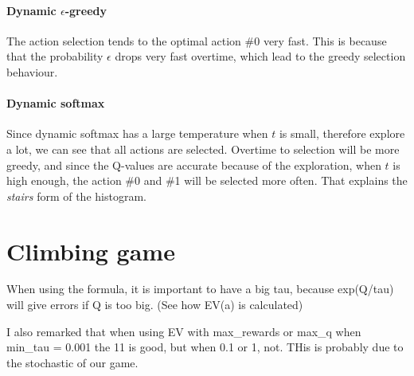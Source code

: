 \documentclass[letterpaper]{article}
\begin{document}
\paragraph{Dynamic $\epsilon$-greedy}

The action selection tends to the optimal action \#0 very fast. This
is because that the probability $\epsilon$ drops very fast overtime, which
lead to the greedy selection behaviour.

\paragraph{Dynamic softmax}

Since dynamic softmax has a large temperature when $t$ is small, therefore
explore a lot, we can see that all actions are selected. Overtime
to selection will be more greedy, and since the Q-values are accurate
because of the exploration, when $t$ is high enough, the action \#0 and \#1
will be selected more often. That explains the \textit{stairs} form
of the histogram.

\section{Climbing game}

When using the formula, it is important to have a big tau, because exp(Q/tau)
will give errors if Q is too big. (See how EV(a) is calculated)

I also remarked that when using EV with max_rewards or max_q when
min_tau = 0.001 the 11 is good, but when 0.1 or 1, not. THis is probably
due to the stochastic of our game.
\end{document}
